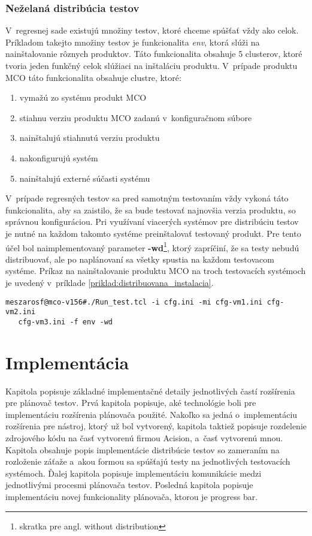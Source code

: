 \subsection*{Neželaná distribúcia testov}
V~regresnej sade existujú množiny testov, ktoré chceme spúšťať vždy ako celok.
Príkladom takejto množiny testov je funkcionalita \textit{env}, ktorá
slúži na nainštalovanie rôznych produktov. Táto funkcionalita obsahuje 5 clusterov,
ktoré tvoria jeden funkčný celok slúžiaci na inštaláciu produktu.
V~prípade produktu MCO táto funkcionalita obsahuje clustre, ktoré:
\begin{enumerate}
\item vymažú zo systému produkt MCO
\item stiahnu verziu produktu MCO zadanú v~konfiguračnom súbore
\item nainštalujú stiahnutú verziu produktu
\item nakonfigurujú systém
\item nainštalujú externé súčasti systému
\end{enumerate} 

V~prípade regresných testov sa pred samotným testovaním vždy vykoná táto 
funkcionalita, aby sa zaistilo, že sa bude testovať najnovšia verzia produktu,
so správnou konfiguráciou.
Pri využívaní viacerých systémov pre distribúciu testov je nutné na každom
takomto systéme preinštalovať testovaný produkt. 
Pre tento účel bol naimplementovaný parameter 
\textbf{-wd}\footnote{skratka pre angl. without distribution}, 
ktorý zapríčiní, že sa testy nebudú distribuovať, ale po naplánovaní 
sa všetky spustia na každom testovacom systéme. 
Príkaz na nainštalovanie produktu MCO na troch testovacích systémoch 
je uvedený v~príklade \ref{priklad:distribuovana_instalacia}.

\begin{lstlisting}[caption=Inštalácia produktu MCO na troch systémoch súčasne,
label=priklad:distribuovana_instalacia]
meszarosf@mco-v156#./Run_test.tcl -i cfg.ini -mi cfg-vm1.ini cfg-vm2.ini 
   cfg-vm3.ini -f env -wd
\end{lstlisting}


%
%
\chapter{Implementácia}
\label{kapitola:implementacia}
Kapitola popisuje základné implementačné detaily jednotlivých častí 
rozšírenia pre plánovač testov. Prvá kapitola popisuje, aké 
technológie boli pre implementáciu rozšírenia plánovača použité.
Nakoľko sa jedná o~implementáciu rozšírenia pre nástroj, ktorý už bol 
vytvorený, kapitola taktiež popisuje rozdelenie zdrojového kódu na časť 
vytvorenú firmou Acision, a~časť vytvorenú mnou.
Kapitola obsahuje popis implementácie distribúcie testov so zameraním na 
rozloženie záťaže a~akou formou sa spúšťajú testy na jednotlivých 
testovacích systémoch. Ďalej kapitola popisuje implementáciu 
komunikácie medzi jednotlivými procesmi plánovača testov.
Posledná kapitola popisuje implementáciu 
novej funkcionality plánovača, ktorou je progress bar.

